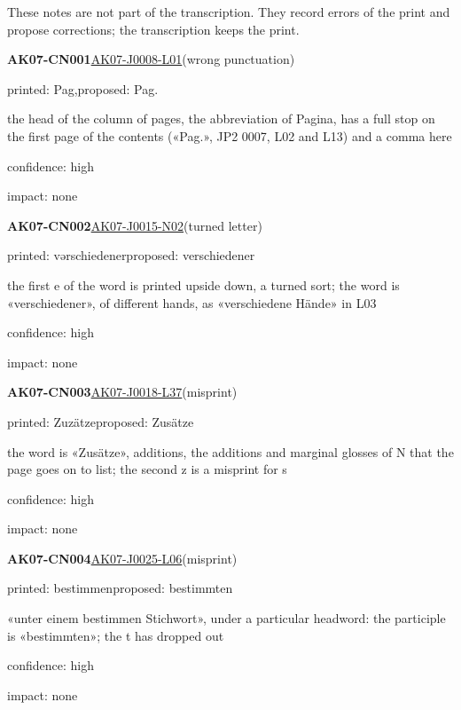 \documentclass[11pt]{article}
\begin{document}
\clearpage{}\par\medskip\noindent These notes are not part of the transcription. They record errors of the print and propose corrections; the transcription keeps the print.\par\medskip
\noindent\textbf{AK07-CN001}\enspace\hyperlink{AK07-J0008-L01}{AK07-J0008-L01}\enspace(wrong punctuation)\par\noindent printed: Pag,\enspace proposed: Pag.\par\noindent the head of the column of pages, the abbreviation of Pagina, has a full stop on the first page of the contents («Pag.», JP2 0007, L02 and L13) and a comma here\par\noindent confidence: high\par\noindent impact: none\par\medskip
\noindent\textbf{AK07-CN002}\enspace\hyperlink{AK07-J0015-N02}{AK07-J0015-N02}\enspace(turned letter)\par\noindent printed: vərschiedener\enspace proposed: verschiedener\par\noindent the first e of the word is printed upside down, a turned sort; the word is «verschiedener», of different hands, as «verschiedene Hände» in L03\par\noindent confidence: high\par\noindent impact: none\par\medskip
\noindent\textbf{AK07-CN003}\enspace\hyperlink{AK07-J0018-L37}{AK07-J0018-L37}\enspace(misprint)\par\noindent printed: Zuzätze\enspace proposed: Zusätze\par\noindent the word is «Zusätze», additions, the additions and marginal glosses of N that the page goes on to list; the second z is a misprint for s\par\noindent confidence: high\par\noindent impact: none\par\medskip
\noindent\textbf{AK07-CN004}\enspace\hyperlink{AK07-J0025-L06}{AK07-J0025-L06}\enspace(misprint)\par\noindent printed: bestimmen\enspace proposed: bestimmten\par\noindent «unter einem bestimmen Stichwort», under a particular headword: the participle is «bestimmten»; the t has dropped out\par\noindent confidence: high\par\noindent impact: none\par\medskip
\end{document}
